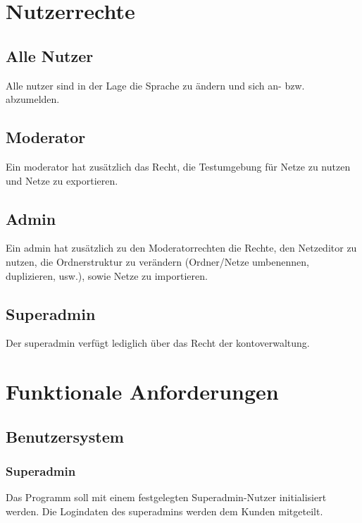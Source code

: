 \documentclass[parskip=full,11pt,twoside]{scrartcl}
\begin{document}
\section{Nutzerrechte}

\subsection{Alle Nutzer}
Alle \Gls{nutzer} sind in der Lage die Sprache zu ändern und sich an- bzw. abzumelden.


\subsection{Moderator}
Ein \Gls{moderator} hat zusätzlich das Recht, die Testumgebung für Netze zu nutzen und Netze zu exportieren. %


\subsection{Admin}
Ein \Gls{admin} hat zusätzlich zu den Moderatorrechten die Rechte, den Netzeditor zu nutzen, die Ordnerstruktur zu verändern (Ordner/Netze umbenennen, duplizieren, usw.), sowie Netze zu importieren.


\subsection{Superadmin}
Der \Gls{superadmin} verfügt lediglich über das Recht der \Gls{konto}verwaltung.

\section{Funktionale Anforderungen}

\subsection{Benutzersystem}
\subsubsection{Superadmin}

Das Programm soll mit einem festgelegten Superadmin-Nutzer initialisiert werden. Die Logindaten des \Gls{superadmin}s werden dem Kunden mitgeteilt.
\end{document}
